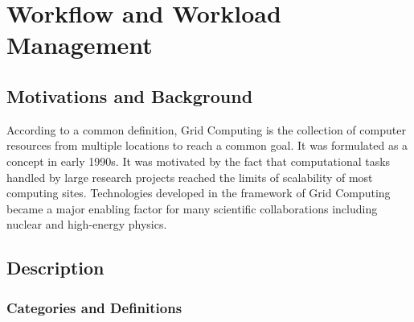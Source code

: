 \section{Workflow and Workload Management}

\subsection{Motivations and Background}
According to a common definition, Grid Computing is the collection of computer resources from multiple locations to reach a common goal. 
It was formulated as a concept in early 1990s. It was motivated by the fact that computational tasks handled by large research projects reached the limits of scalability of most computing sites. Technologies developed in the framework of Grid Computing became a major enabling factor for many scientific collaborations including nuclear and high-energy physics.

\subsection{Description}
\subsubsection{Categories and Definitions}

